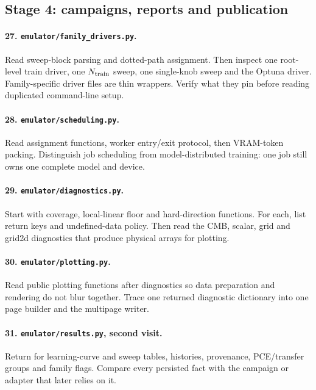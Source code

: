 \documentclass[10pt,aps,prd,twocolumn,nofootinbib]{revtex4-2}
\newcommand{\code}[1]{\texttt{#1}}
\begin{document}
\subsection{Stage 4: campaigns, reports and publication}

\paragraph{27.  \code{emulator/family\_drivers.py}.}
Read sweep-block parsing and dotted-path assignment.  Then inspect one
root-level train driver, one \(N_{\rm train}\) sweep, one single-knob sweep and
the Optuna driver.  Family-specific driver files are thin wrappers.  Verify
what they pin before reading duplicated command-line setup.

\paragraph{28.  \code{emulator/scheduling.py}.}
Read assignment functions, worker entry/exit protocol, then VRAM-token
packing.  Distinguish job scheduling from model-distributed training: one job
still owns one complete model and device.

\paragraph{29.  \code{emulator/diagnostics.py}.}
Start with coverage, local-linear floor and hard-direction functions.  For
each, list return keys and undefined-data policy.  Then read the CMB, scalar,
grid and grid2d diagnostics that produce physical arrays for plotting.

\paragraph{30.  \code{emulator/plotting.py}.}
Read public plotting functions after diagnostics so data preparation and
rendering do not blur together.  Trace one returned diagnostic dictionary into
one page builder and the multipage writer.

\paragraph{31.  \code{emulator/results.py}, second visit.}
Return for learning-curve and sweep tables, histories, provenance, PCE/transfer
groups and family flags.  Compare every persisted fact with the campaign or
adapter that later relies on it.
\end{document}
